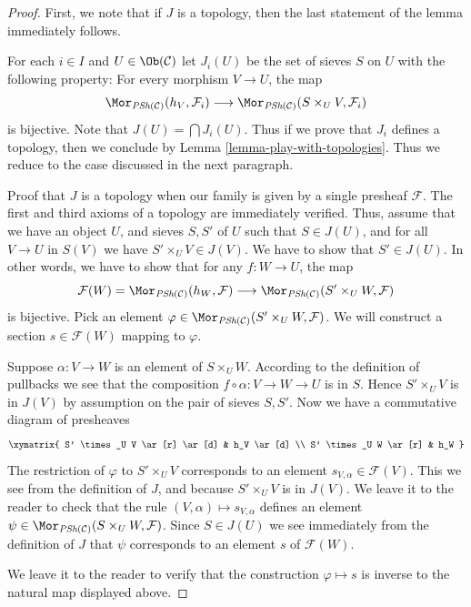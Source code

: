 \begin{proof}
First, we note that if $J$ is a topology, then the last statement of
the lemma immediately follows.

\medskip\noindent
For each $i \in I$ and $U \in \Ob(\mathcal{C})$ let $J_i(U)$
be the set of sieves $S$ on $U$ with the following property:
For every morphism $V \to U$, the map
$$
\Mor_{\textit{PSh}(\mathcal{C})}(h_V, \mathcal{F}_i)
\longrightarrow
\Mor_{\textit{PSh}(\mathcal{C})}(S \times_U V, \mathcal{F}_i)
$$
is bijective. Note that $J(U) = \bigcap J_i(U)$. Thus if we prove
that $J_i$ defines a topology, then we conclude by
Lemma \ref{lemma-play-with-topologies}.
Thus we reduce to the case discussed in the next paragraph.

\medskip\noindent
Proof that $J$ is a topology when our family is given by a single
presheaf $\mathcal{F}$. The first and third axioms of
a topology are immediately verified. Thus, assume that
we have an object $U$, and sieves $S, S'$ of $U$
such that $S \in J(U)$, and for all $V \to U$ in $S(V)$
we have $S' \times_U V \in J(V)$. We have to show that
$S' \in J(U)$. In other words, we have to show that for
any $f : W \to U$, the map
$$
\mathcal{F}(W) =
\Mor_{\textit{PSh}(\mathcal{C})}(h_W, \mathcal{F})
\longrightarrow
\Mor_{\textit{PSh}(\mathcal{C})}(S' \times_U W, \mathcal{F})
$$
is bijective. Pick an element $\varphi \in
\Mor_{\textit{PSh}(\mathcal{C})}(S' \times_U W, \mathcal{F})$.
We will construct a section $s \in \mathcal{F}(W)$
mapping to $\varphi$.

\medskip\noindent
Suppose $\alpha : V \to W$ is an element of $S \times_U W$.
According to the definition of pullbacks we see that
the composition $f \circ \alpha : V \to W  \to U$ is in $S$. Hence
$S' \times_U V$ is in $J(V)$ by assumption on the pair
of sieves $S, S'$. Now we have a commutative diagram
of presheaves
$$
\xymatrix{
S' \times_U V \ar[r] \ar[d] & h_V \ar[d] \\
S' \times_U W \ar[r] & h_W
}
$$
The restriction of $\varphi$ to $S' \times_U V$
corresponds to an element $s_{V, \alpha} \in \mathcal{F}(V)$.
This we see from the definition of $J$,
and because $S' \times_U V$ is in $J(V)$.
We leave it to the reader to check
that the rule $(V, \alpha) \mapsto s_{V, \alpha}$ defines
an element
$\psi \in
\Mor_{\textit{PSh}(\mathcal{C})}(S \times_U W, \mathcal{F})$.
Since $S \in J(U)$ we see immediately from the definition of $J$
that $\psi$ corresponds to an element $s$ of $\mathcal{F}(W)$.

\medskip\noindent
We leave it to the reader to verify that the construction
$\varphi \mapsto s$ is inverse to the natural map displayed above.
\end{proof}

